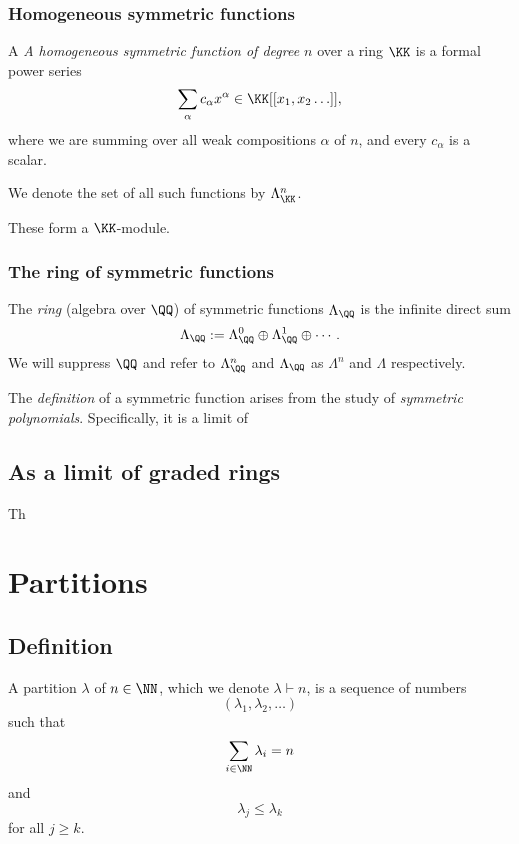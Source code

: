 \documentclass{article}
\begin{document}
\subsubsection{Homogeneous symmetric functions}

\begin{definition}
    A \textit{A homogeneous symmetric function of degree $n$} over a ring $\KK$ is a formal power series
    \[
        \sum_\alpha c_\alpha x^\alpha \in \KK[[x_1,x_2\ldots]],
    \]
    where we are summing over all weak compositions $\alpha$ of $n$, and every $c_\alpha$ is a scalar.
    
    We denote the set of all such functions by $\Lambda_\KK^n$.
\end{definition}

These form a $\KK$-module.

\subsubsection{The ring of symmetric functions}

\begin{definition}
    The \textit{ring} (algebra over $\QQ$) of symmetric functions $\Lambda_\QQ$ is the infinite direct sum
    \[
        \Lambda_\QQ := \Lambda_\QQ^0 \oplus\Lambda_\QQ^1 \oplus \cdots.
    \]
    We will suppress $\QQ$ and refer to $\Lambda_\QQ^n$ and $\Lambda_\QQ$ as $\Lambda^n$ and $\Lambda$ respectively.
\end{definition}


The \textit{definition} of a symmetric function arises from the study of \textit{symmetric polynomials}. Specifically, it is a limit of


\subsection{As a limit of graded rings}

Th

\section{Partitions}
\subsection{Definition}
\begin{definition}
    A partition $\lambda$ of $n \in \NN$, which we denote $\lambda \vdash n$, is a sequence of numbers 
    \[
        (\lambda_1,\lambda_2,\ldots)
    \]
    such that 
    \[
        \sum_{i\in\NN}\lambda_i = n
    \]
    and 
    \[
        \lambda_j \leq \lambda_k
    \]
    for all $j\geq k$.
\end{definition}
\end{document}
